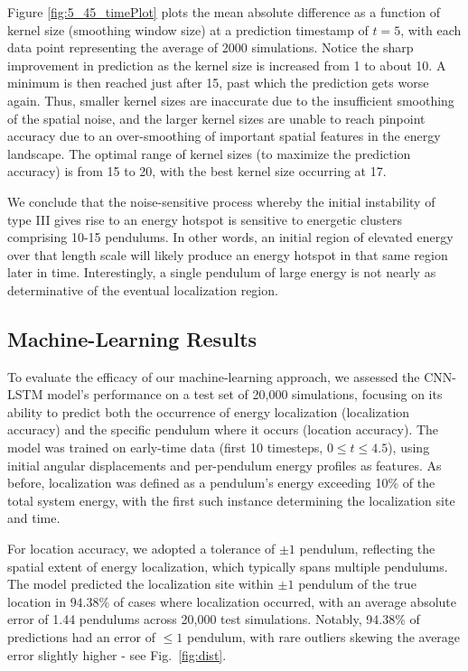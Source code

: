 \documentclass[11pt]{article}
\begin{document}
Figure \ref{fig:5_45_timePlot} plots the mean absolute difference as a function of kernel size (smoothing window size) at a prediction timestamp of $t=5$, with each data point representing the average of 2000 simulations. Notice the sharp improvement in prediction as the kernel size is increased from 1 to about 10. A minimum is then reached just after 15, past which the prediction gets worse again. Thus, smaller kernel sizes are inaccurate due to the insufficient smoothing of the spatial noise, and the larger kernel sizes are unable to reach pinpoint accuracy due to an over-smoothing of important spatial features in the energy landscape. The optimal range of kernel sizes (to maximize the prediction accuracy) is from 15 to 20, with the best kernel size occurring at 17. 

We conclude that the noise-sensitive process whereby the initial instability of type III gives rise to an energy hotspot is sensitive to energetic clusters comprising 10-15 pendulums. In other words, an initial region of elevated energy over that length scale will likely produce an energy hotspot in that same region later in time. Interestingly, a single pendulum of large energy is not nearly as determinative of the eventual localization region.

\subsection{Machine-Learning Results}

To evaluate the efficacy of our machine-learning approach, we assessed the CNN-LSTM model's performance on a test set of 20,000 simulations, focusing on its ability to predict both the occurrence of energy localization (localization accuracy) and the specific pendulum where it occurs (location accuracy). The model was trained on early-time data (first 10 timesteps, $0 \leq t \leq 4.5$), using initial angular displacements and per-pendulum energy profiles as features. As before, localization was defined as a pendulum's energy exceeding 10\% of the total system energy, with the first such instance determining the localization site and time.

For location accuracy, we adopted a tolerance of $\pm 1$ pendulum, reflecting the spatial extent of energy localization, which typically spans multiple pendulums. The model predicted the localization site within $\pm 1$ pendulum of the true location in $94.38\%$ of cases where localization occurred, with an average absolute error of 1.44 pendulums across 20,000 test simulations. Notably, 94.38\% of predictions had an error of $\leq 1$ pendulum, with rare outliers skewing the average error slightly higher - see Fig.~\ref{fig:dist}.
\end{document}
